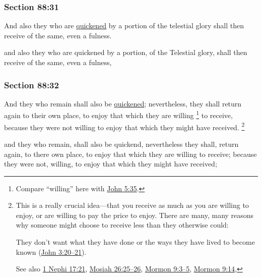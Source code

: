 	\subsubsection{Section 88:31} %
		\label{DC88-31}

		And also they who are \hyperref[QUICKEN]{quickened} by a portion of the telestial glory shall then receive of the same, even a fulness.

		\begin{framed}
		\scriptsize
			\begin{compactdesc}
				\item[JSP] and also they who are quickened by a portion, of the Telestial glory, shall then receive of the same, even a fulness,
			\end{compactdesc}
		\end{framed}

	\subsubsection{Section 88:32} %
		\label{DC88-32}

		And they who remain shall also be \hyperref[QUICKEN]{quickened}; nevertheless, they shall return again to their own place, to enjoy that which they are willing%
			\footnote{%
				Compare ``willing'' here with \hyperref[JOHN-5-35]{John 5:35}.
				}
		to receive, because they were not willing to enjoy that which they might have received.%
			\footnote{%
				This is a really crucial idea---that you receive as much as you are willing to enjoy, or are willing to pay the price to enjoy. There are many, many reasons why someone might choose to receive less than they otherwise could:
					\begin{compactitem}
						\item They don't want what they have done or the ways they have lived to become known (\hyperref[JOHN-3-20]{John 3:20--21}).
					\end{compactitem}
				See also \hyperref[1NEPHI-17-21]{1 Nephi 17:21}, \hyperref[MOSIAH-26-25]{Mosiah 26:25--26}, \hyperref[MORMON-9-3]{Mormon 9:3--5}, \hyperref[MORMON-9-14]{Mormon 9:14}, 
				}

		\begin{framed}
		\scriptsize
			\begin{compactdesc}
				\item[JSP] and they who remain, shall also be quickend, nevertheless they shall, return again, to there own place, to enjoy that which they are willing to receive; because they were not, willing, to enjoy that which they might have received;
			\end{compactdesc}
		\end{framed}

